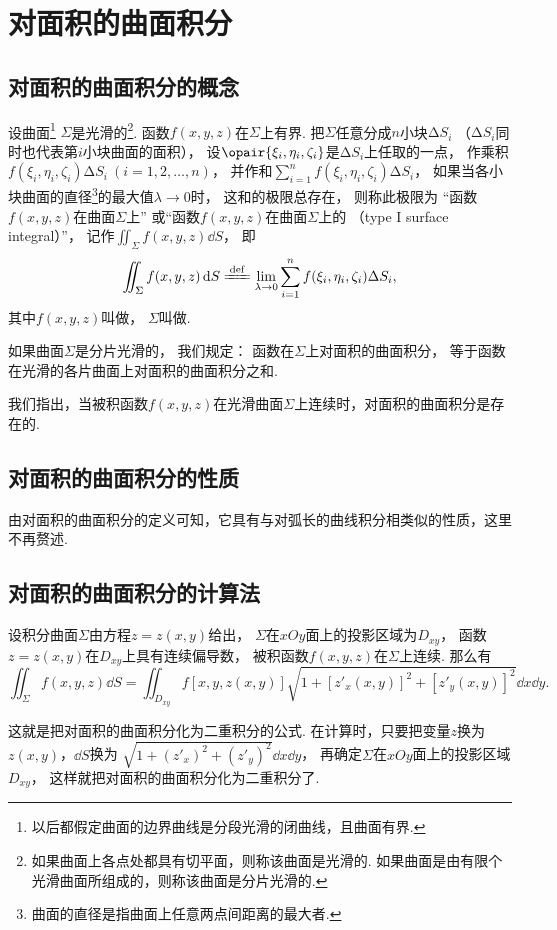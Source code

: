 \section{对面积的曲面积分}
\subsection{对面积的曲面积分的概念}
\begin{definition}
设曲面\footnote{以后都假定曲面的边界曲线是分段光滑的闭曲线，且曲面有界.}%
\(\Sigma\)是光滑的\footnote{如果曲面上各点处都具有切平面，则称该曲面是光滑的.
如果曲面是由有限个光滑曲面所组成的，则称该曲面是分片光滑的.}.
函数\(f(x,y,z)\)在\(\Sigma\)上有界.
把\(\Sigma\)任意分成\(n\)小块\(\increment S_i\)
（\(\increment S_i\)同时也代表第\(i\)小块曲面的面积），
设\(\opair{\xi_i,\eta_i,\zeta_i}\)是\(\increment S_i\)上任取的一点，
作乘积\(f(\xi_i,\eta_i,\zeta_i) \increment S_i\ (i=1,2,\dotsc,n)\)，
并作和\(\sum\limits_{i=1}^n f(\xi_i,\eta_i,\zeta_i) \increment S_i\)，
如果当各小块曲面的直径\footnote{%
曲面的直径是指曲面上任意两点间距离的最大者.}的最大值\(\lambda\to0\)时，
这和的极限总存在，
则称此极限为
“函数\(f(x,y,z)\)在曲面\(\Sigma\)上”
或“函数\(f(x,y,z)\)在曲面\(\Sigma\)上的%
（type I surface integral）”，
记作\(\iint_\Sigma{f(x,y,z)\dd{S}}\)，
即\[
	\iint_\Sigma f(x,y,z)\dd{S}
	\defeq
	\lim\limits_{\lambda\to0} \sum\limits_{i=1}^n f(\xi_i,\eta_i,\zeta_i) \increment S_i,
\]
其中\(f(x,y,z)\)叫做，
\(\Sigma\)叫做.

如果曲面\(\Sigma\)是分片光滑的，
我们规定：
函数在\(\Sigma\)上对面积的曲面积分，
等于函数在光滑的各片曲面上对面积的曲面积分之和.
\end{definition}
我们指出，当被积函数\(f(x,y,z)\)在光滑曲面\(\Sigma\)上连续时，对面积的曲面积分是存在的.

\subsection{对面积的曲面积分的性质}
由对面积的曲面积分的定义可知，它具有与对弧长的曲线积分相类似的性质，这里不再赘述.

\subsection{对面积的曲面积分的计算法}
\begin{theorem}
设积分曲面\(\Sigma\)由方程\(z=z(x,y)\)给出，
\(\Sigma\)在\(xOy\)面上的投影区域为\(D_{xy}\)，
函数\(z=z(x,y)\)在\(D_{xy}\)上具有连续偏导数，
被积函数\(f(x,y,z)\)在\(\Sigma\)上连续.
那么有\[
\iint_\Sigma{f(x,y,z)\dd{S}}
=\iint_{D_{xy}}{f[x,y,z(x,y)] \sqrt{1+[z'_x(x,y)]^2+[z'_y(x,y)]^2} \dd{x}\dd{y}}.
\]
\end{theorem}
这就是把对面积的曲面积分化为二重积分的公式.
在计算时，只要把变量\(z\)换为\(z(x,y)\)，\(\dd{S}\)换为
\(\sqrt{1+(z'_x)^2+(z'_y)^2} \dd{x}\dd{y}\)，
再确定\(\Sigma\)在\(xOy\)面上的投影区域\(D_{xy}\)，
这样就把对面积的曲面积分化为二重积分了.

